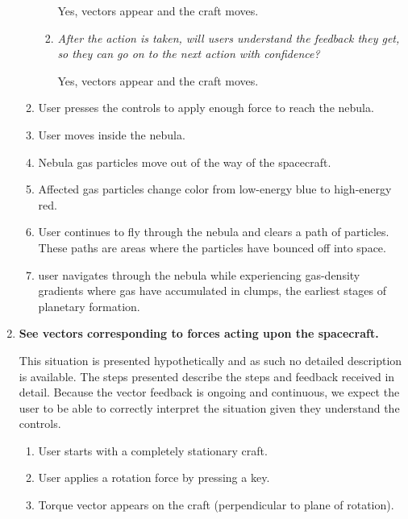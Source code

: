 \begin{enumerate}
\begin{enumerate}
\begin{enumerate}
    Yes, vectors appear and the craft moves.
    \item \emph{After the action is taken, will users understand the feedback they get, so they can go on to the next action with confidence?}

    Yes, vectors appear and the craft moves.
  \end{enumerate}

  \item User presses the controls to apply enough force to reach the nebula.

  \item User moves inside the nebula.

  \item Nebula gas particles move out of the way of the spacecraft.

  \item Affected gas particles change color from low-energy blue to high-energy red.

  \item User continues to fly through the nebula and clears a path of particles.  These paths are areas where the particles have bounced off into space.

  \item user navigates through the nebula while experiencing gas-density gradients where gas have accumulated in clumps, the earliest stages of planetary formation.

\end{enumerate}

\item\textbf{See vectors corresponding to forces acting upon the spacecraft.}

This situation is presented hypothetically and as such no detailed description is available.  The steps presented describe the steps and feedback received in detail.  Because the vector feedback is ongoing and continuous, we expect the user to be able to correctly interpret the situation given they understand the controls.

\begin{enumerate}

  \item User starts with a completely stationary craft.

  \item User applies a rotation force by pressing a key.

  \item Torque vector appears on the craft (perpendicular to plane of rotation).
  

\end{enumerate}
\end{enumerate}
